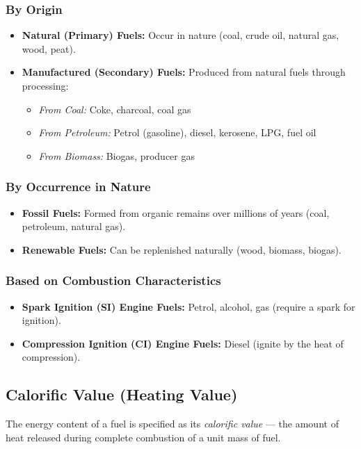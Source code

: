 \documentclass[12pt,a4paper]{article}
\begin{document}
\subsubsection{By Origin}
\begin{itemize}
    \item \textbf{Natural (Primary) Fuels:} Occur in nature (coal, crude oil, natural gas, wood, peat).
    \item \textbf{Manufactured (Secondary) Fuels:} Produced from natural fuels through processing:
    \begin{itemize}
        \item \textit{From Coal:} Coke, charcoal, coal gas
        \item \textit{From Petroleum:} Petrol (gasoline), diesel, kerosene, LPG, fuel oil
        \item \textit{From Biomass:} Biogas, producer gas
    \end{itemize}
\end{itemize}

\subsubsection{By Occurrence in Nature}
\begin{itemize}
    \item \textbf{Fossil Fuels:} Formed from organic remains over millions of years (coal, petroleum, natural gas).
    \item \textbf{Renewable Fuels:} Can be replenished naturally (wood, biomass, biogas).
\end{itemize}

\subsubsection{Based on Combustion Characteristics}
\begin{itemize}
    \item \textbf{Spark Ignition (SI) Engine Fuels:} Petrol, alcohol, gas (require a spark for ignition).
    \item \textbf{Compression Ignition (CI) Engine Fuels:} Diesel (ignite by the heat of compression).
\end{itemize}

\subsection{Calorific Value (Heating Value)}
The energy content of a fuel is specified as its \emph{calorific value} --- the amount of heat released during complete combustion of a unit mass of fuel.
\end{document}
